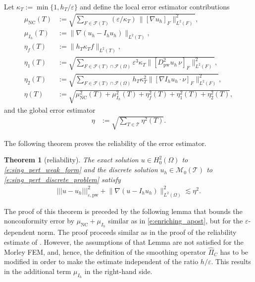 \documentclass[a4paper]{amsart}
\newtheorem{theorem}{Theorem}
\theoremstyle{definition}
\numberwithin{equation}{section}
\numberwithin{theorem}{section}
\newcommand{\pw}{\mathrm{pw}}
\newcommand{\nc}{\mathrm{NC}}
\newcommand{\tri}{\mathcal{T}}
\newcommand{\ennorm}[1]{\lvert\!\lvert\!\lvert #1 \rvert\!\rvert\!\rvert}
\begin{document}
Let $\kappa_T:=\min\{1,h_T/\varepsilon\}$ and 
define the local error estimator contributions
\begin{align*}
    \mu_\nc(T)&:=\sqrt{\sum_{F\in\mathcal{F}(T)}
        (\varepsilon/\kappa_T)\, \lVert [\nabla u_h]_F\rVert_{L^2(F)}^2 },\\
    \mu_{I_h}(T)&:= \lVert\nabla(u_h-I_h u_h)\rVert_{L^2(T)},\\
    \eta_f(T)&:= \lVert h_T\kappa_T f\rVert_{L^2(T)},\\
    \eta_1(T)&:= \sqrt{\sum_{F\in\mathcal{F}(T)\cap \mathcal{F}(\Omega)}
            \varepsilon^{3}\kappa_T
               \lVert [D^2_\pw u_h\,\nu]_F\rVert_{L^2(F)}^2
          },\\
    \eta_2(T)&:=\sqrt{\sum_{F\in\mathcal{F}(T)\cap \mathcal{F}(\Omega)}
            h_T\kappa_T^2
               \lVert [\nabla I_h u_h\cdot\nu]_F\rVert_{L^2(F)}^2
          },\\
    \eta(T)&:= \sqrt{\mu_\nc^2(T)+\mu_{I_h}^2(T)+\eta_f^2(T)
        +\eta_1^2(T) + \eta_2^2(T)}, %
\end{align*}
and the global error estimator
\begin{align*}
        \eta&:=\sqrt{\sum_{T\in\tri} \eta^2(T)}.
\end{align*}




The following theorem proves the reliability of the error estimator.

\begin{theorem}[reliability]\label{t:sp_reliability}
    The exact solution $u\in H^2_0(\Omega)$ to \eqref{e:sing_pert_weak_form} 
    and the discrete solution $u_h\in \mathcal{M}_0(\tri)$ 
    to \eqref{e:sing_pert_discrete_problem} satisfy
    \begin{align*}
        \ennorm{u-u_h}_{\varepsilon,\pw}^2 
        + \lVert\nabla(u-I_h u_h)\rVert_{L^2(\Omega)}^2
        \lesssim \eta^2.
    \end{align*}
\end{theorem}

The proof of this theorem is preceded by the following lemma
that bounds 
the nonconformity error by $\mu_\nc+\mu_{I_h}$ similar as in 
\eqref{e:enriching_apost}, but for the $\varepsilon$-dependent norm.
The proof proceeds similar as in the proof of 
the reliability estimate of \cite[Lemma~3.5]{GallistlTian2024}. 
However, the assumptions of that Lemma are not 
satisfied for the Morley FEM, and, hence, the definition
of the smoothing operator $\hat{\Pi}_C$ has to be modified
in order to make the estimate independent of the ratio
$h/\varepsilon$. This results in the additional
term $\mu_{I_h}$ in the right-hand side.
\end{document}

